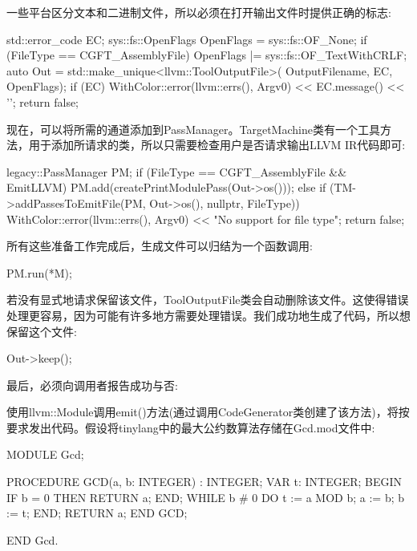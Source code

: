 一些平台区分文本和二进制文件，所以必须在打开输出文件时提供正确的标志:

\begin{cpp}
std::error_code EC;
sys::fs::OpenFlags OpenFlags = sys::fs::OF_None;
if (FileType == CGFT_AssemblyFile)
    OpenFlags |= sys::fs::OF_TextWithCRLF;
auto Out = std::make_unique<llvm::ToolOutputFile>(
    OutputFilename, EC, OpenFlags);
if (EC) {
    WithColor::error(llvm::errs(), Argv0)
        << EC.message() << '\n';
    return false;
}
\end{cpp}

现在，可以将所需的通道添加到PassManager。TargetMachine类有一个工具方法，用于添加所请求的类，所以只需要检查用户是否请求输出LLVM IR代码即可:

\begin{cpp}
    legacy::PassManager PM;
    if (FileType == CGFT_AssemblyFile && EmitLLVM) {
        PM.add(createPrintModulePass(Out->os()));
    } else {
        if (TM->addPassesToEmitFile(PM, Out->os(), nullptr,
                                    FileType)) {
            WithColor::error(llvm::errs(), Argv0)
                << "No support for file type\n";
            return false;
        }
    }
\end{cpp}

所有这些准备工作完成后，生成文件可以归结为一个函数调用:

\begin{cpp}
PM.run(*M);
\end{cpp}

若没有显式地请求保留该文件，ToolOutputFile类会自动删除该文件。这使得错误处理更容易，因为可能有许多地方需要处理错误。我们成功地生成了代码，所以想保留这个文件:

\begin{cpp}
Out->keep();
\end{cpp}

最后，必须向调用者报告成功与否:

\begin{cpp}
    return true;
}
\end{cpp}

使用llvm::Module调用emit()方法(通过调用CodeGenerator类创建了该方法)，将按要求发出代码。假设将tinylang中的最大公约数算法存储在Gcd.mod文件中:

\begin{shell}
MODULE Gcd;

PROCEDURE GCD(a, b: INTEGER) : INTEGER;
VAR t: INTEGER;
BEGIN
    IF b = 0 THEN
        RETURN a;
    END;
    WHILE b # 0 DO
    t := a MOD b;
    a := b;
    b := t;
    END;
    RETURN a;
END GCD;

END Gcd.
\end{shell}

